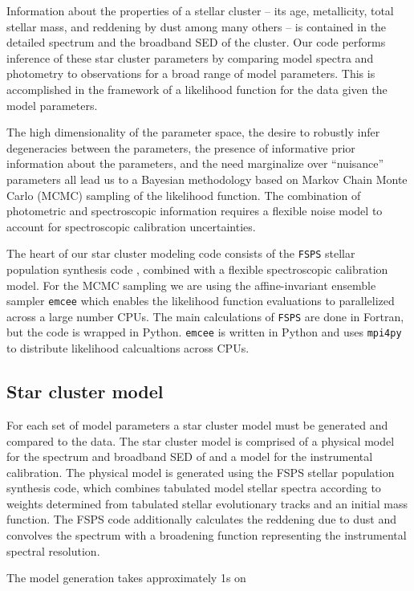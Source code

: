 \documentclass[11pt,preprint]{aastex}
\begin{document}
Information about the properties of a stellar cluster -- its age, metallicity, total stellar mass, and reddening by dust among many others -- is contained in the detailed spectrum and the broadband SED of the cluster. 
Our code performs inference of these star cluster parameters by comparing model spectra and photometry to observations for a broad range of model parameters.  
This is accomplished in the framework of a likelihood function for the data given the model parameters.  

The high dimensionality of the parameter space, the desire to robustly infer degeneracies between the parameters, the presence of informative prior information about the parameters, and the need marginalize over ``nuisance'' parameters all lead us to a Bayesian methodology based on Markov Chain Monte Carlo (MCMC) sampling of the likelihood function. 
The combination of photometric and spectroscopic information requires a flexible noise model to account for spectroscopic calibration uncertainties.

The heart of our star cluster modeling code consists of the \texttt{FSPS} stellar population synthesis code \citep{fsps}, combined with a flexible spectroscopic calibration model.  
For the MCMC sampling we are using the affine-invariant ensemble sampler \texttt{emcee} \citep{emcee} which enables the likelihood function evaluations to parallelized across a large number CPUs. 
The main calculations of \texttt{FSPS} are done in Fortran, but the code is wrapped in Python.  \texttt{emcee} is written in Python and uses \texttt{mpi4py} to distribute likelihood calcualtions across CPUs.

\subsection{Star cluster model}
For each set of model parameters a star cluster model must be generated and compared to the data. 
The star cluster model is comprised of a physical model for the spectrum and broadband SED of and a model for the instrumental calibration.  
The physical model is generated using the FSPS stellar population synthesis code, which combines tabulated model stellar spectra according to weights determined from tabulated stellar evolutionary tracks and an initial mass function.  
The FSPS code additionally calculates the reddening due to dust and convolves the spectrum with a broadening function representing the instrumental spectral resolution.

The model generation takes approximately 1s on 
\end{document}

